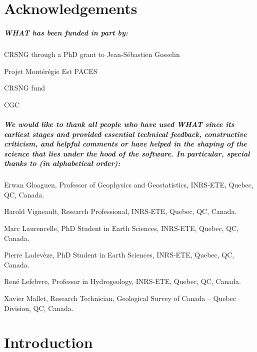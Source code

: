 \documentclass[10pt, letterpaper, fleqn]{report}
\begin{document}
\newpage

\chapter*{Acknowledgements}

\paragraph{WHAT has been funded in part by:}
\begin{description}
\item{CRSNG through a PhD grant to Jean-Sébastien Gosselin}
\item{Projet Montérégie Est PACES}
\item{CRSNG fund}
\item{CGC}
\end{description}
\paragraph{We would like to thank all people who have used WHAT since its earliest stages and provided essential technical feedback, constructive criticism, and helpful comments or have helped in the shaping of the science that lies under the hood of the software.
In particular, special thanks to (in alphabetical order):}
\begin{description}
\item{Erwan Gloaguen, Professor of Geophysics and Geostatistics, INRS-ETE, Quebec, QC, Canada.}
\item{Harold Vigneault, Research Professional, INRS-ETE, Quebec, QC, Canada.}
\item{Marc Laurencelle, PhD Student in Earth Sciences, INRS-ETE, Quebec, QC, Canada.}
\item{Pierre Ladevèze, PhD Student in Earth Sciences, INRS-ETE, Quebec, QC, Canada.}
\item{René Lefebvre, Professor in Hydrogeology, INRS-ETE, Quebec, QC, Canada.}
\item{Xavier Mallet, Research Technician, Geological Survey of Canada – Quebec Division, QC, Canada.}
\end{description}

\newpage

\chapter*{Introduction}
\end{document}
